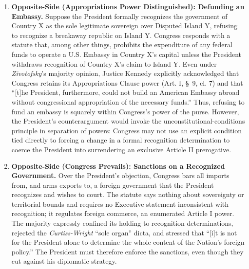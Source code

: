 \documentclass[12pt]{article}
\begin{document}
\begin{enumerate}
\item \textbf{Opposite-Side (Appropriations Power Distinguished): Defunding an Embassy.} Suppose the President formally recognizes the government of Country X as the sole legitimate sovereign over Disputed Island Y, refusing to recognize a breakaway republic on Island Y. Congress responds with a statute that, among other things, prohibits the expenditure of any federal funds to operate a U.S. Embassy in Country X's capital unless the President withdraws recognition of Country X's claim to Island Y. Even under \textit{Zivotofsky}'s majority opinion, Justice Kennedy explicitly acknowledged that Congress retains its Appropriations Clause power (Art. I, \S~9, cl. 7) and that ``[t]he President, furthermore, could not build an American Embassy abroad without congressional appropriation of the necessary funds.'' Thus, refusing to fund an embassy is squarely within Congress's power of the purse. However, the President's counterargument would invoke the unconstitutional-conditions principle in separation of powers: Congress may not use an explicit condition tied directly to forcing a change in a formal recognition determination to coerce the President into surrendering an exclusive Article II prerogative.

\item \textbf{Opposite-Side (Congress Prevails): Sanctions on a Recognized Government.} Over the President's objection, Congress bars all imports from, and arms exports to, a foreign government that the President recognizes and wishes to court. The statute says nothing about sovereignty or territorial bounds and requires no Executive statement inconsistent with recognition; it regulates foreign commerce, an enumerated Article I power. The majority expressly confined its holding to recognition determinations, rejected the \textit{Curtiss-Wright} ``sole organ'' dicta, and stressed that ``[i]t is not for the President alone to determine the whole content of the Nation's foreign policy.'' The President must therefore enforce the sanctions, even though they cut against his diplomatic strategy.


\end{enumerate}
\end{document}

